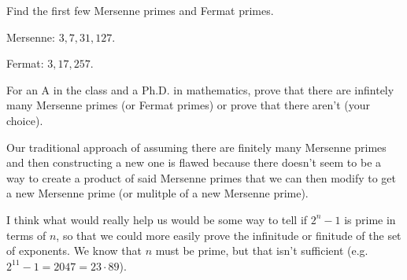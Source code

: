 \documentclass[../main.tex]{subfiles}
\begin{document}
\begin{ex} \label{2.44}
  Find the first few Mersenne primes and Fermat primes.
\end{ex}

Mersenne: $3, 7, 31, 127$.

Fermat: $3, 17, 257$.



\begin{ex} \label{2.45}
  For an A in the class and a Ph.D. in mathematics, prove that there are infintely many Mersenne primes (or Fermat primes) or prove that there aren't (your choice).
\end{ex}

Our traditional approach of assuming there are finitely many Mersenne primes and then constructing a new one is flawed because there doesn't seem to be a way to create a product of said Mersenne primes that we can then modify to get a new Mersenne prime (or mulitple of a new Mersenne prime).

I think what would really help us would be some way to tell if $2^n-1$ is prime in terms of $n$, so that we could more easily prove the infinitude or finitude of the set of exponents. We know that $n$ must be prime, but that isn't sufficient (e.g. $2^11 - 1 = 2047 = 23 \cdot 89$).
\end{document}
